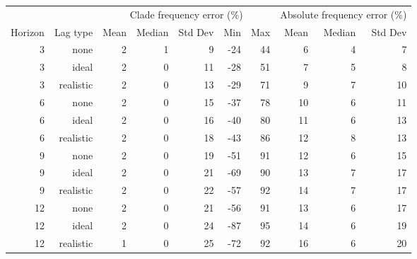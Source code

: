 
\begin{tabular*}{1.0\textwidth}{rrrrrrrrrr}
\toprule
        &            & \multicolumn{5}{c}{Clade frequency error (\%)} & \multicolumn{3}{c}{Absolute frequency error (\%)} \\
Horizon & Lag type & Mean & Median & Std Dev & Min & Max & Mean & Median & Std Dev \\
\midrule

3 & none & 2 & 1 & 9 & -24 & 44 & 6 & 4 & 7 \\
3 & ideal & 2 & 0 & 11 & -28 & 51 & 7 & 5 & 8 \\
3 & realistic & 2 & 0 & 13 & -29 & 71 & 9 & 7 & 10 \\
6 & none & 2 & 0 & 15 & -37 & 78 & 10 & 6 & 11 \\
6 & ideal & 2 & 0 & 16 & -40 & 80 & 11 & 6 & 13 \\
6 & realistic & 2 & 0 & 18 & -43 & 86 & 12 & 8 & 13 \\
9 & none & 2 & 0 & 19 & -51 & 91 & 12 & 6 & 15 \\
9 & ideal & 2 & 0 & 21 & -69 & 90 & 13 & 7 & 17 \\
9 & realistic & 2 & 0 & 22 & -57 & 92 & 14 & 7 & 17 \\
12 & none & 2 & 0 & 21 & -56 & 91 & 13 & 6 & 17 \\
12 & ideal & 2 & 0 & 24 & -87 & 95 & 14 & 6 & 19 \\
12 & realistic & 1 & 0 & 25 & -72 & 92 & 16 & 6 & 20 \\

\bottomrule
\end{tabular*}

